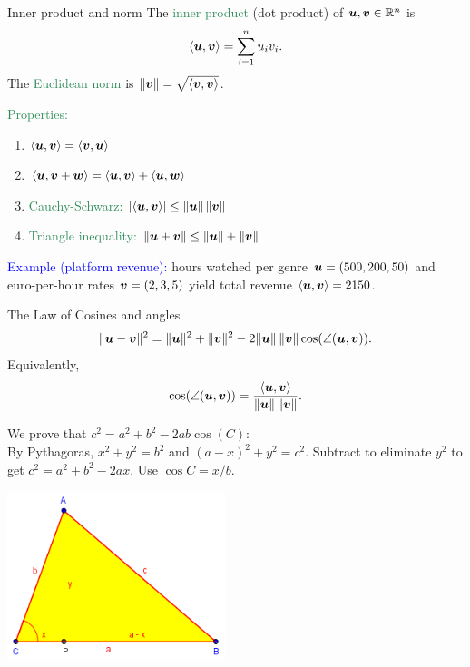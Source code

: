 \documentclass[11pt,aspectratio=169]{beamer}
\begin{document}
\begin{frame}{Inner product and norm}
The \textcolor{SeaGreen}{inner product} (dot product) of $\boldsymbol u,\boldsymbol v\in\mathbb{R}^n$ is
\[
\langle \boldsymbol u,\boldsymbol v\rangle = \sum_{i=1}^n u_i v_i.
\]
The \textcolor{SeaGreen}{Euclidean norm} is $\|\boldsymbol v\|=\sqrt{\langle \boldsymbol v,\boldsymbol v\rangle}$.
\bigskip

\textcolor{SeaGreen}{Properties:}
\begin{enumerate}
\item $\langle \boldsymbol u,\boldsymbol v\rangle=\langle \boldsymbol v,\boldsymbol u\rangle$
\item $\langle \boldsymbol u,\boldsymbol v+\boldsymbol w\rangle=\langle \boldsymbol u,\boldsymbol v\rangle+\langle \boldsymbol u,\boldsymbol w\rangle$
\item \textcolor{SeaGreen}{Cauchy-Schwarz:} $|\langle \boldsymbol u,\boldsymbol v\rangle|\le \|\boldsymbol u\|\,\|\boldsymbol v\|$
\item \textcolor{SeaGreen}{Triangle inequality:} $\|\boldsymbol u+\boldsymbol v\|\le \|\boldsymbol u\|+\|\boldsymbol v\|$
\end{enumerate}
\medskip
\textcolor{blue}{Example (platform revenue):} hours watched per genre $\boldsymbol u=(500,200,50)$ and euro-per-hour rates $\boldsymbol v=(2,3,5)$ yield total revenue
$\langle \boldsymbol u,\boldsymbol v\rangle=2150$.
\end{frame}

\begin{frame}{The Law of Cosines and angles}
\[
\|\boldsymbol u-\boldsymbol v\|^2=\|\boldsymbol u\|^2+\|\boldsymbol v\|^2 - 2\|\boldsymbol u\|\,\|\boldsymbol v\|\cos(\angle(\boldsymbol u,\boldsymbol v)).
\]
Equivalently,
\[
\cos(\angle(\boldsymbol u,\boldsymbol v))=\frac{\langle \boldsymbol u,\boldsymbol v\rangle}{\|\boldsymbol u\|\,\|\boldsymbol v\|}.
\]
\begin{minipage}{9cm}
	\begin{small}
	We prove that $c^2=a^2+b^2-2ab \cos(C)$:\\[3mm]
By Pythagoras, $x^2+y^2=b^2$ and $(a-x)^2+y^2=c^2$. Subtract to eliminate $y^2$ to get $c^2=a^2+b^2-2a x$. Use $\cos C = x/b$.
\end{small}
\end{minipage}\begin{minipage}{5cm}
	\includegraphics[width=2.5in]{img/cos}
\end{minipage}
\end{frame}
\end{document}
